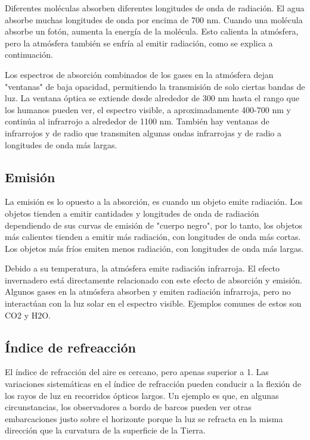 \documentclass{article} %
\begin{document}
Diferentes moléculas absorben diferentes longitudes de onda de radiación. El agua absorbe muchas longitudes de onda por encima de 700 nm. Cuando una molécula absorbe un fotón, aumenta la energía de la molécula. Esto calienta la atmósfera, pero la atmósfera también se enfría al emitir radiación, como se explica a continuación.

Los espectros de absorción combinados de los gases en la atmósfera dejan "ventanas" de baja opacidad, permitiendo la transmisión de solo ciertas bandas de luz. La ventana óptica se extiende desde alrededor de 300 nm hasta el rango que los humanos pueden ver, el espectro visible, a aproximadamente 400-700 nm y continúa al infrarrojo a alrededor de 1100 nm. También hay ventanas de infrarrojos y de radio que transmiten algunas ondas infrarrojas y de radio a longitudes de onda más largas.


\subsection{Emisión}

La emisión es lo opuesto a la absorción, es cuando un objeto emite radiación. Los objetos tienden a emitir cantidades y longitudes de onda de radiación dependiendo de sus curvas de emisión de "cuerpo negro", por lo tanto, los objetos más calientes tienden a emitir más radiación, con longitudes de onda más cortas. Los objetos más fríos emiten menos radiación, con longitudes de onda más largas.

Debido a su temperatura, la atmósfera emite radiación infrarroja. El efecto invernadero está directamente relacionado con este efecto de absorción y emisión. Algunos gases en la atmósfera absorben y emiten radiación infrarroja, pero no interactúan con la luz solar en el espectro visible. Ejemplos comunes de estos son CO2 y H2O.

\subsection{Índice de refreacción}

El índice de refracción del aire es cercano, pero apenas superior a 1. Las variaciones sistemáticas en el índice de refracción pueden conducir a la flexión de los rayos de luz en recorridos ópticos largos. Un ejemplo es que, en algunas circunstancias, los observadores a bordo de barcos pueden ver otras embarcaciones justo sobre el horizonte porque la luz se refracta en la misma dirección que la curvatura de la superficie de la Tierra.
\end{document}
